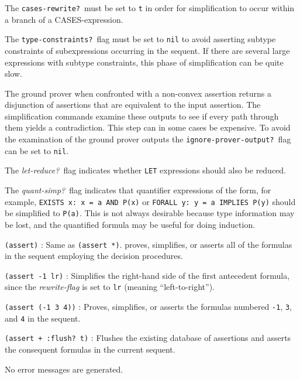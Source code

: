 \documentclass[12pt]{book}
\newenvironment{usage}[1]{\item[usage:\hspace*{-0.175in}]#1\begin{description}\setlength{\itemindent}{-0.2in}\setlength{\itemsep}{0.1in}}{\end{description}}
\begin{document}
\begin{description}
The \texttt{cases-rewrite?}\ must be set to \texttt{t} in order for
simplification to occur within a branch of a CASES-expression.

The \texttt{type-constraints?}\ flag must be set to \texttt{nil} to
avoid asserting subtype constraints of subexpressions occurring in the
sequent.  If there are several large expressions with subtype constraints,
this phase of simplification can be quite slow.

The ground prover when confronted with a non-convex assertion returns a
disjunction of assertions that are equivalent to the input assertion.  The
simplification commands examine these outputs to see if every path through
them yields a contradiction.  This step can in some cases be expensive.
To avoid the examination of the ground prover outputs the
\texttt{ignore-prover-output?}\ flag can be set to \texttt{nil}.

The \emph{let-reduce?}\ flag indicates whether \texttt{LET} expressions
should also be reduced.

The \emph{quant-simp?}\ flag indicates that quantifier expressions of the
form, for example, \texttt{EXISTS x: x = a AND P(x)} or \texttt{FORALL y:
y = a IMPLIES P(y)} should be simplified to \texttt{P(a)}.  This is not
always desirable because type information may be lost, and the quantified
formula may be useful for doing induction.



\begin{usage}{}

\item[\texttt{(assert)}] : Same as \texttt{(assert *)}.  proves, simplifies, or
asserts all of the formulas in the sequent employing the decision
procedures.

\item[\texttt{(assert -1 lr)}] : Simplifies the right-hand side of the first
antecedent formula, since the \emph{rewrite-flag} is set to \texttt{lr}
(meaning ``left-to-right'').

\item[\texttt{(assert (-1 3 4))}] : Proves, simplifies, or asserts the
formulas numbered \texttt{-1}, \texttt{3}, and \texttt{4} in the sequent.

\item[\texttt{(assert + :flush?\ t)}] : Flushes the existing database of
assertions and asserts the consequent formulas in the current sequent.
\end{usage}

\item[errors:] No error messages are generated.


\end{description}
\end{document}
